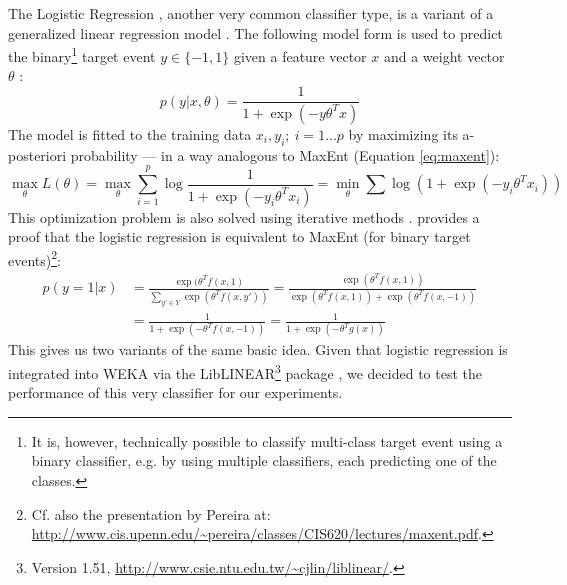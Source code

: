 \documentclass[12pt,notitlepage]{report}
\begin{document}
The Logistic Regression \citep{hosmer00}, another very common classifier type, is a variant of a generalized linear regression model \citep{maccullagh91}. The following model form is used to predict the binary\footnote{It is, however, technically possible to classify multi-class target event using a binary classifier, e.g. by using multiple classifiers, each predicting one of the classes.} target event $y \in\{-1,1\}$ given a feature vector $x$ and a weight vector $\theta$ \citep{lee06}:
\begin{equation}
p(y|x,\theta) = \frac{1}{1 + \exp(-y\theta^T x)}
\end{equation}
The model is fitted to the training data $x_i,y_i;\ i = 1\dots p$ by maximizing its a-posteriori probability --- in a way analogous to MaxEnt (Equation \ref{eq:maxent}):
\begin{equation}\label{eq:logreg}
\max_\theta L(\theta) = \max_\theta \sum_{i=1}^p \log \frac{1}{1 + \exp(-y_i\theta^T x_i)} = \min_\theta \sum\log(1 + \exp(-y_i\theta^T x_i))
\end{equation}
This optimization problem is also solved using iterative methods \citep{fan08}. \citet{blower04} provides a proof that the logistic regression is equivalent to MaxEnt (for binary target events)\footnote{Cf. also the presentation by Pereira at:\\ \url{http://www.cis.upenn.edu/\~pereira/classes/CIS620/lectures/maxent.pdf}.}:
\begin{align}
p(y=1|x) & = \frac{\exp(\theta^T f(x,1)}{\sum_{y'\in Y} \exp(\theta^T f(x,y'))} = \frac{\exp(\theta^T f(x,1))}{\exp(\theta^T f(x,1)) + \exp(\theta^T f(x,-1))} \\
& = \frac{1}{1 + \exp(-\theta^T f(x,-1))} = \frac{1}{1 + \exp(-\theta^T g(x))}
\end{align}
This gives us two variants of the same basic idea. Given that logistic regression is integrated into WEKA via the LibLINEAR\footnote{Version 1.51, \url{http://www.csie.ntu.edu.tw/\~cjlin/liblinear/}.} package \citep{fan08}, we decided to test the performance of this very classifier for our experiments.
\end{document}
